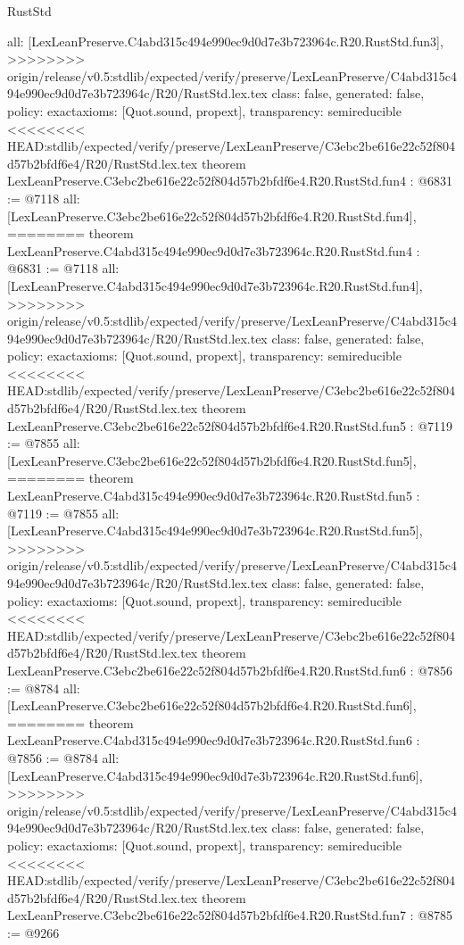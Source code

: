 \begin{lexlean}{RustStd}
\begin{coremodule}
{\begin{coremodule}
{{{{{{{  all: [LexLeanPreserve.C4abd315c494e990ec9d0d7e3b723964c.R20.RustStd.fun3],
>>>>>>>> origin/release/v0.5:stdlib/expected/verify/preserve/LexLeanPreserve/C4abd315c494e990ec9d0d7e3b723964c/R20/RustStd.lex.tex
  class: false,
  generated: false,
  policy: exact{axioms: [Quot.sound, propext]},
  transparency: semireducible
}
<<<<<<<< HEAD:stdlib/expected/verify/preserve/LexLeanPreserve/C3ebc2be616e22c52f804d57b2bfdf6e4/R20/RustStd.lex.tex
theorem LexLeanPreserve.C3ebc2be616e22c52f804d57b2bfdf6e4.R20.RustStd.fun4 : @6831 := @7118 {
  all: [LexLeanPreserve.C3ebc2be616e22c52f804d57b2bfdf6e4.R20.RustStd.fun4],
========
theorem LexLeanPreserve.C4abd315c494e990ec9d0d7e3b723964c.R20.RustStd.fun4 : @6831 := @7118 {
  all: [LexLeanPreserve.C4abd315c494e990ec9d0d7e3b723964c.R20.RustStd.fun4],
>>>>>>>> origin/release/v0.5:stdlib/expected/verify/preserve/LexLeanPreserve/C4abd315c494e990ec9d0d7e3b723964c/R20/RustStd.lex.tex
  class: false,
  generated: false,
  policy: exact{axioms: [Quot.sound, propext]},
  transparency: semireducible
}
<<<<<<<< HEAD:stdlib/expected/verify/preserve/LexLeanPreserve/C3ebc2be616e22c52f804d57b2bfdf6e4/R20/RustStd.lex.tex
theorem LexLeanPreserve.C3ebc2be616e22c52f804d57b2bfdf6e4.R20.RustStd.fun5 : @7119 := @7855 {
  all: [LexLeanPreserve.C3ebc2be616e22c52f804d57b2bfdf6e4.R20.RustStd.fun5],
========
theorem LexLeanPreserve.C4abd315c494e990ec9d0d7e3b723964c.R20.RustStd.fun5 : @7119 := @7855 {
  all: [LexLeanPreserve.C4abd315c494e990ec9d0d7e3b723964c.R20.RustStd.fun5],
>>>>>>>> origin/release/v0.5:stdlib/expected/verify/preserve/LexLeanPreserve/C4abd315c494e990ec9d0d7e3b723964c/R20/RustStd.lex.tex
  class: false,
  generated: false,
  policy: exact{axioms: [Quot.sound, propext]},
  transparency: semireducible
}
<<<<<<<< HEAD:stdlib/expected/verify/preserve/LexLeanPreserve/C3ebc2be616e22c52f804d57b2bfdf6e4/R20/RustStd.lex.tex
theorem LexLeanPreserve.C3ebc2be616e22c52f804d57b2bfdf6e4.R20.RustStd.fun6 : @7856 := @8784 {
  all: [LexLeanPreserve.C3ebc2be616e22c52f804d57b2bfdf6e4.R20.RustStd.fun6],
========
theorem LexLeanPreserve.C4abd315c494e990ec9d0d7e3b723964c.R20.RustStd.fun6 : @7856 := @8784 {
  all: [LexLeanPreserve.C4abd315c494e990ec9d0d7e3b723964c.R20.RustStd.fun6],
>>>>>>>> origin/release/v0.5:stdlib/expected/verify/preserve/LexLeanPreserve/C4abd315c494e990ec9d0d7e3b723964c/R20/RustStd.lex.tex
  class: false,
  generated: false,
  policy: exact{axioms: [Quot.sound, propext]},
  transparency: semireducible
}
<<<<<<<< HEAD:stdlib/expected/verify/preserve/LexLeanPreserve/C3ebc2be616e22c52f804d57b2bfdf6e4/R20/RustStd.lex.tex
theorem LexLeanPreserve.C3ebc2be616e22c52f804d57b2bfdf6e4.R20.RustStd.fun7 : @8785 := @9266 {
}}}}}}}}}}
\end{coremodule}}
\end{coremodule}
\end{lexlean}
